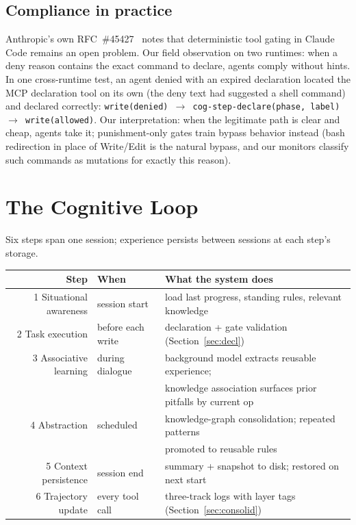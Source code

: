 \documentclass{article}
\begin{document}
\subsection{Compliance in practice}

Anthropic's own RFC~\#45427~\cite{anthropic45427} notes that deterministic tool gating in Claude Code remains an open problem. Our field observation on two runtimes: when a deny reason contains the exact command to declare, agents comply without hints. In one cross-runtime test, an agent denied with an expired declaration located the MCP declaration tool on its own (the deny text had suggested a shell command) and declared correctly:
\texttt{write(denied) $\rightarrow$ cog-step-declare(phase, label) $\rightarrow$ write(allowed)}.
Our interpretation: when the legitimate path is clear and cheap, agents take it; punishment-only gates train bypass behavior instead (bash redirection in place of Write/Edit is the natural bypass, and our monitors classify such commands as mutations for exactly this reason).

\section{The Cognitive Loop}\label{sec:loop}

Six steps span one session; experience persists between sessions at each step's storage.

\begin{center}
\begin{tabular}{rll}
\toprule
Step & When & What the system does \\
\midrule
1 Situational awareness & session start & load last progress, standing rules, relevant knowledge \\
2 Task execution & before each write & declaration + gate validation (Section~\ref{sec:decl}) \\
3 Associative learning & during dialogue & background model extracts reusable experience; \\
 & & knowledge association surfaces prior pitfalls by current op \\
4 Abstraction & scheduled & knowledge-graph consolidation; repeated patterns \\
 & & promoted to reusable rules \\
5 Context persistence & session end & summary + snapshot to disk; restored on next start \\
6 Trajectory update & every tool call & three-track logs with layer tags (Section~\ref{sec:consolid}) \\
\bottomrule
\end{tabular}
\end{center}
\end{document}
